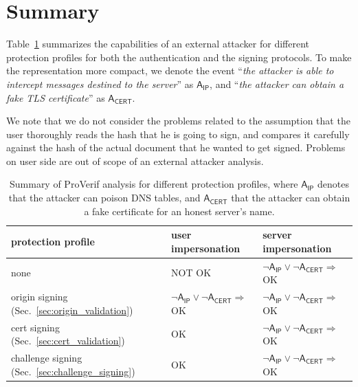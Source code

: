 \newcommand{\implies}{\Rightarrow}
\newcommand{\dns}{\mathsf{A_{IP}}}
\newcommand{\tls}{\mathsf{A_{CERT}}}
\section{Summary}

Table~\ref{table:proverifsummary} summarizes the capabilities of an external attacker for different protection profiles for both the authentication and the signing protocols. To make the representation more compact, we denote the event ``\emph{the attacker is able to intercept messages destined to the server}'' as $\dns$, and ``\emph{the attacker can obtain a fake TLS certificate}'' as $\tls$.

We note that we do not consider the problems related to the assumption that the user thoroughly reads the hash that he is going to sign, and compares it carefully against the hash of the actual document that he wanted to get signed. Problems on user side are out of scope of an external attacker analysis.

\begin{table}[ht]
\center
\begin{tabular}{| l | l | l |}
\hline
protection profile &  user impersonation & server impersonation                \\
\hline
none              & NOT OK               & $\neg\dns\vee\neg\tls\implies$OK \\
origin signing  (Sec.~\ref{sec:origin_validation})    & $\neg\dns\vee\neg\tls\implies$OK & $\neg\dns\vee\neg\tls\implies$OK \\
cert signing (Sec.~\ref{sec:cert_validation})       & OK                   & $\neg\dns\vee\neg\tls\implies$OK \\
challenge signing (Sec.~\ref{sec:challenge_signing}) & OK               & $\neg\dns\vee\neg\tls\implies$OK \\
\hline
\end{tabular}
\caption{Summary of ProVerif analysis for different protection profiles, where $\dns$ denotes that the attacker can poison DNS tables, and $\tls$ that the attacker can obtain a fake certificate for an honest server's name.}\label{table:proverifsummary}
\end{table}
